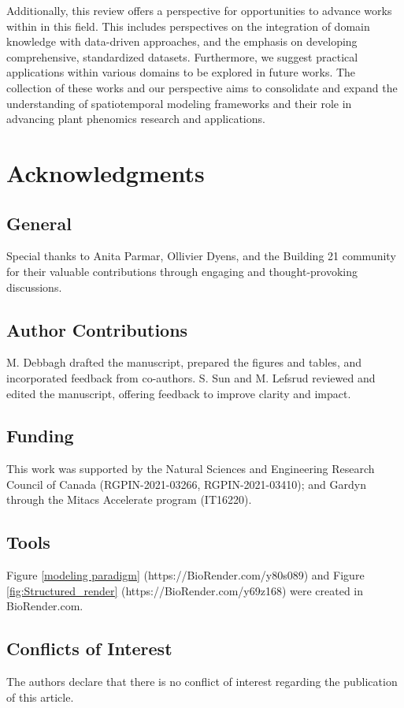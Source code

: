 \documentclass{article}
\begin{document}
\pagebreak

Additionally, this review offers a perspective for opportunities to advance works within in this field. This includes perspectives on the integration of domain knowledge with data-driven approaches, and the emphasis on developing comprehensive, standardized datasets. Furthermore, we suggest practical applications within various domains to be explored in future works. The collection of these works and our perspective aims to consolidate and expand the understanding of spatiotemporal modeling frameworks and their role in advancing plant phenomics research and applications.


\section*{Acknowledgments}
\subsection*{General} 
Special thanks to Anita Parmar, Ollivier Dyens, and the Building 21 community for their valuable contributions through engaging and thought-provoking discussions.
\subsection*{Author Contributions} 
M. Debbagh drafted the manuscript, prepared the figures and tables, and incorporated feedback from co-authors. S. Sun and M. Lefsrud reviewed and edited the manuscript, offering feedback to improve clarity and impact.

\subsection*{Funding}
This work was supported by the Natural Sciences and Engineering Research Council of Canada (RGPIN-2021-03266, RGPIN-2021-03410); and Gardyn through the Mitacs Accelerate program (IT16220).

\subsection*{Tools} 
Figure \ref{modeling paradigm} (https://BioRender.com/y80s089) and Figure \ref{fig:Structured_render} (https://BioRender.com/y69z168) were created in BioRender.com.

\subsection*{Conflicts of Interest}
The authors declare that there is no conflict of interest regarding the publication of this article.

\pagebreak

 
 
\end{document}
